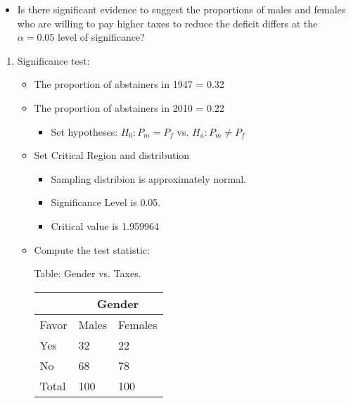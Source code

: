 \documentclass[11pt]{book}\usepackage[]{graphicx}\usepackage[]{color}
\begin{document}
\begin{exercises}
\begin{exercise}
\begin{itemize}
\item Is there significant evidence to suggest the proportions of males and females \\ who are willing to pay higher taxes to reduce the deficit differs at the $\alpha = 0.05$ level of significance?
\end{itemize}

  \vspace{5mm}

\end{exercise}
\vspace{2mm}
\begin{solution}

  	  \begin{enumerate}
	 \item Significance test:


\begin{itemize}
\item The proportion of abstainers in 1947 = 0.32
\item The proportion of abstainers in 2010 = 0.22
  \begin{itemize}
  \item Set hypotheses: $H_0: P_m = P_f$ vs. $H_a: P_m \ne P_f$
  \end{itemize}

\item Set Critical Region and distribution

  \begin{itemize}
  \item Sampling distribion is approximately normal.
  \item Significance Level is 0.05.
  \item Critical value is 1.959964
  \end{itemize}

\item Compute the test statistic:

\begin{minipage}[h]{6cm}

Table: Gender vs. Taxes.



      \begin{tabular}{@{} p{2.5cm} p{1cm} p{1cm} @{}} \hline %
     &  \multicolumn{2}{c}{Gender } \\ \hline
     Favor   & Males & Females \\ \hline
     Yes   & 32 & 22 \\
     No          & 68 & 78 \\ \hline
     Total        & 100 & 100 \\ \hline
   \end{tabular}


\end{minipage}
\end{itemize}
\end{enumerate}
\end{solution}
\end{exercises}
\end{document}
